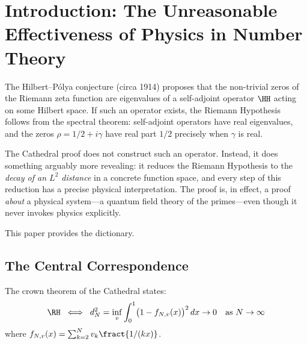 \section{Introduction: The Unreasonable Effectiveness of Physics in Number Theory}

The Hilbert--P\'olya conjecture (circa 1914) proposes that the non-trivial
zeros of the Riemann zeta function are eigenvalues of a self-adjoint operator
$\HH$ acting on some Hilbert space. If such an operator exists, the Riemann
Hypothesis follows from the spectral theorem: self-adjoint operators have
real eigenvalues, and the zeros $\rho = 1/2 + i\gamma$ have real part $1/2$
precisely when $\gamma$ is real.

The Cathedral proof does not construct such an operator. Instead, it does
something arguably more revealing: it reduces the Riemann Hypothesis to
the \emph{decay of an $L^2$ distance} in a concrete function space, and
every step of this reduction has a precise physical interpretation. The proof
is, in effect, a proof \emph{about} a physical system---a quantum field
theory of the primes---even though it never invokes physics explicitly.

This paper provides the dictionary.

\subsection{The Central Correspondence}

The crown theorem of the Cathedral states:
\[
  \RH \;\iff\;
  d_N^2 = \inf_v \int_0^1 \bigl(1 - f_{N,v}(x)\bigr)^2\,dx \to 0
  \quad\text{as } N \to \infty
\]
where $f_{N,v}(x) = \sum_{k=2}^N v_k \fract{1/(kx)}$.

